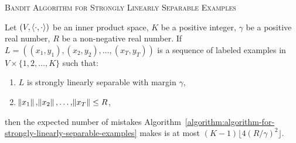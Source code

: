 \begin{algorithm}[h]
\caption{\textsc{Bandit Algorithm for Strongly Linearly Separable Examples}
\label{algorithm:algorithm-for-strongly-linearly-separable-examples}}
\begin{algorithmic}[1]
{
\ELSE
{}
\label{line:pos-update}
\ENDIF
\ELSE
{}
\label{line:neg-update}
\ELSE
{}
\ENDIF
\ENDIF
\ENDFOR
}
\end{algorithmic}
\end{algorithm}


\begin{theorem}
\label{theorem:strongly-separable-examples-mistake-upper-bound}
Let $(V, \left\langle \cdot, \cdot \right\rangle)$ be an inner product space, $K$ be a positive
integer, $\gamma$ be a positive real number, $R$ be a non-negative real number. If
$L = ((x_1, y_1), (x_2, y_2), \dots, (x_T, y_T))$ is a sequence of labeled examples in
$V \times \{1,2,\dots,K\}$ such that:
\begin{enumerate}
  \item $L$ is strongly linearly separable with margin $\gamma$,
  \item $\norm{x_1}, \norm{x_2}, \dots, \norm{x_T} \le R$,
\end{enumerate}
then the
expected number of mistakes
Algorithm~\ref{algorithm:algorithm-for-strongly-linearly-separable-examples}
makes is at most $(K-1) \lfloor 4(R/\gamma)^2 \rfloor$.
\end{theorem}


